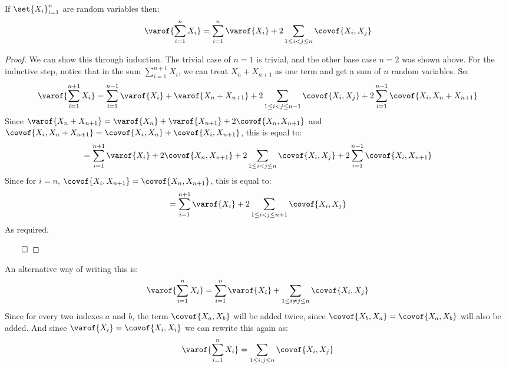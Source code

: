 \begin{thrm*}[varCovRelationTheorem]

	If $\set{X_i}_{i=1}^n$ are random variables then:
	\[ \varof{\sum_{i=1}^n X_i} = \sum_{i=1}^n\varof{X_i} + 2\sum_{1\leq i<j\leq n}\covof{X_i,X_j} \]

\end{thrm*}

\begin{proof}

	We can show this through induction.
	The trivial case of $n=1$ is trivial, and the other base case $n=2$ was shown above.
	For the inductive step, notice that in the sum $\sum\limits_{i=1}^{n+1}X_i$, we can treat $X_n+X_{n+1}$ as one term and get a
	sum of $n$ random variables.
	So:
	\[ \varof{\sum_{i=1}^{n+1} X_i} = \sum_{i=1}^{n-1}\varof{X_i} + \varof{X_n+X_{n+1}} + 2\sum_{1\leq i<j\leq n-1}\covof{X_i,X_j} +
	2\sum_{i=1}^{n-1}\covof{X_i,X_n+X_{n+1}} \]
	Since $\varof{X_n+X_{n+1}}=\varof{X_n}+\varof{X_{n+1}}+2\covof{X_n,X_{n+1}}$ and
	$\covof{X_i,X_n+X_{n+1}}=\covof{X_i,X_n}+\covof{X_i,X_{n+1}}$, this is equal to:
	\[ = \sum_{i=1}^{n+1}\varof{X_i} + 2\covof{X_n,X_{n+1}} + 2\sum_{1\leq i<j\leq n}\covof{X_i,X_j} + 2\sum_{i=1}^{n-1}\covof{X_i,X_{n+1}} \]
	Since for $i=n$, $\covof{X_i,X_{n+1}}=\covof{X_n,X_{n+1}}$, this is equal to:
	\[ = \sum_{i=1}^{n+1}\varof{X_i} + 2\sum_{1\leq i<j\leq n+1}\covof{X_i,X_j} \]
	As required.

	\hfill$\qed$

\end{proof}

An alternative way of writing this is:
\[ \varof{\sum_{i=1}^n X_i} = \sum_{i=1}^n\varof{X_i} + \sum_{1\leq i\neq j\leq n}\covof{X_i,X_j} \]
Since for every two indexes $a$ and $b$, the term $\covof{X_a,X_b}$ will be added twice, since $\covof{X_b,X_a}=\covof{X_a,X_b}$ will also be
added.
And since $\varof{X_i}=\covof{X_i,X_i}$ we can rewrite this again as:
\[ \varof{\sum_{i=1}^n X_i} = \sum_{1\leq i,j\leq n}\covof{X_i,X_j} \]

